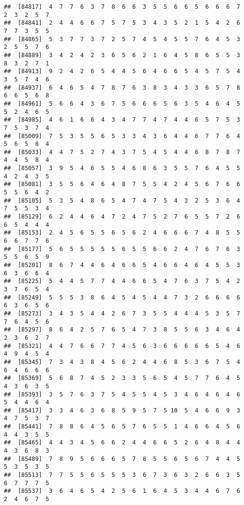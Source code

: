 \documentclass[
]{book}
\begin{document}
\begin{verbatim}
##  [84817]  4  7  7  6  3  7  8  6  6  3  5  5  6  6  5  6  6  6  7  2  3  2  5  7
##  [84841]  2  4  4  6  6  7  5  7  5  3  4  3  5  2  1  5  4  2  6  7  7  3  5  5
##  [84865]  5  3  7  7  3  7  2  5  7  4  5  4  5  5  7  6  4  5  3  2  5  5  7  6
##  [84889]  3  4  2  4  2  3  6  5  6  2  1  6  4  5  8  6  5  5  3  8  3  2  7  1
##  [84913]  9  2  4  2  6  5  4  4  5  6  4  6  6  5  4  5  7  5  4  3  5  7  4  6
##  [84937]  6  4  6  5  4  7  8  7  6  3  8  3  4  3  3  6  5  7  8  6  6  5  6  8
##  [84961]  5  6  6  4  3  6  7  5  6  6  6  5  6  3  5  4  6  4  5  5  2  4  6  5
##  [84985]  4  6  1  6  6  4  3  4  7  7  4  7  4  4  6  5  7  5  3  7  5  3  7  4
##  [85009]  7  5  3  5  5  6  5  3  3  4  3  6  4  4  6  7  7  6  4  5  6  5  8  4
##  [85033]  4  4  7  5  2  7  4  3  7  5  4  5  4  4  6  8  7  8  7  4  4  5  8  4
##  [85057]  3  9  5  4  6  5  5  4  6  8  6  3  5  5  7  6  4  5  5  4  2  4  3  5
##  [85081]  3  5  5  6  4  6  4  8  7  5  5  4  2  4  5  6  7  6  6  5  5  6  4  2
##  [85105]  5  3  5  4  8  6  5  4  7  4  7  5  4  3  2  5  3  6  4  7  5  5  3  4
##  [85129]  6  2  4  4  6  4  7  2  4  7  5  2  7  6  5  5  7  2  6  6  5  4  4  4
##  [85153]  2  4  5  6  5  5  6  5  6  2  4  6  6  6  7  4  8  5  5  6  6  7  7  6
##  [85177]  5  6  5  5  5  5  5  6  5  5  6  6  2  4  7  6  7  6  3  5  5  6  5  9
##  [85201]  8  6  7  4  4  6  4  6  6  5  4  6  6  4  6  4  5  5  3  6  3  6  6  4
##  [85225]  5  4  4  5  7  7  4  4  6  6  5  4  7  6  3  7  5  4  2  3  7  6  5  4
##  [85249]  5  5  5  3  8  6  4  5  4  5  4  4  7  3  2  6  6  6  6  6  3  6  5  6
##  [85273]  3  4  3  5  4  4  2  6  7  3  5  5  4  4  4  5  3  5  7  7  6  4  5  6
##  [85297]  8  6  4  2  5  7  6  5  4  7  3  8  5  5  6  3  4  6  4  2  3  6  2  7
##  [85321]  4  4  7  6  6  7  7  4  5  6  3  6  6  6  6  6  5  4  6  4  9  4  5  4
##  [85345]  7  3  4  3  8  4  5  6  2  4  4  6  8  5  3  6  7  5  4  6  4  6  6  6
##  [85369]  5  6  8  7  4  5  2  3  3  5  6  5  4  5  7  7  6  4  5  4  3  6  3  5
##  [85393]  3  5  7  6  3  7  5  4  5  5  4  5  3  4  6  4  6  4  6  5  4  4  6  4
##  [85417]  3  3  4  6  3  6  8  5  9  5  7  5 10  5  4  6  6  9  3  4  7  5  3  7
##  [85441]  7  8  8  6  4  5  6  5  7  6  5  5  1  4  6  6  4  5  6  4  4  3  5  5
##  [85465]  4  4  3  4  5  6  6  2  4  4  6  6  5  2  6  4  8  4  4  4  3  6  8  3
##  [85489]  7  8  9  5  6  6  6  5  7  8  5  5  6  5  6  7  4  4  5  5  3  5  3  5
##  [85513]  7  7  5  5  6  5  5  5  3  6  7  3  6  3  2  6  6  3  5  6  7  7  7  5
##  [85537]  3  6  4  6  5  4  2  5  6  1  6  4  5  3  4  4  6  7  6  2  4  6  7  5

\end{verbatim}
\end{document}
